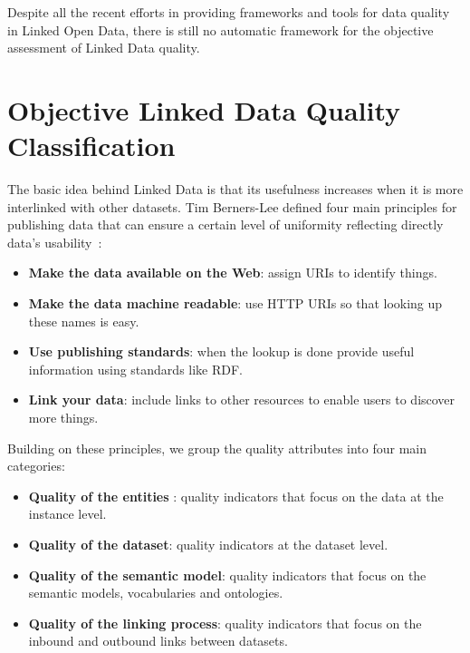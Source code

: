 \documentclass[onecolumn, crcready]{../../Util/LaTEX/iosart2c}
\begin{document}
Despite all the recent efforts in providing frameworks and tools for data quality in Linked Open Data, there is still no automatic framework for the objective assessment of Linked Data quality.


\section{Objective Linked Data Quality Classification}
\label{sec:data-quality-classification}

The basic idea behind Linked Data is that its usefulness increases when it is more interlinked with other datasets. Tim Berners-Lee defined four main principles for publishing data that can ensure a certain level of uniformity reflecting directly data's usability~\cite{Berners-Lee:W3C:06}:

\begin{itemize}
	\item \textbf{Make the data available on the Web}: assign URIs to identify things.
	\item \textbf{Make the data machine readable}: use HTTP URIs so that looking up these names is easy.
	\item \textbf{Use publishing standards}: when the lookup is done provide useful information using standards like RDF.
	\item \textbf{Link your data}: include links to other resources to enable users to discover more things.
\end{itemize}

\noindent
Building on these principles, we group the quality attributes into four main categories:

\begin{itemize}
	\item \textbf{Quality of the entities }: quality indicators that focus on the data at the instance level.
	\item \textbf{Quality of the dataset}: quality indicators at the dataset level.
	\item \textbf{Quality of the semantic model}: quality indicators that focus on the semantic models, vocabularies and ontologies.
	\item \textbf{Quality of the linking process}: quality indicators that focus on the inbound and outbound links between datasets.
\end{itemize}
\end{document}
